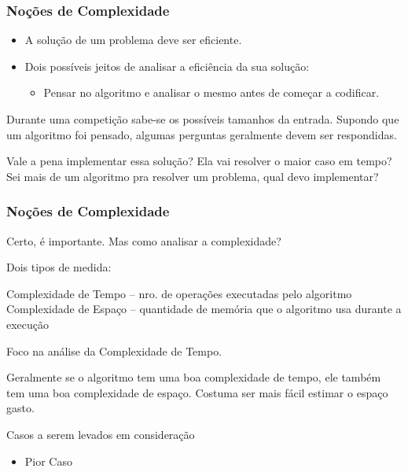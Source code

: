 \begin{frame}
\frametitle{Noções de Complexidade}

\begin{block}{}
\begin{itemize}
	\item[] A solução de um problema deve ser eficiente.
	\item[] Dois possíveis jeitos de analisar a eficiência da sua solução:
	\begin{itemize}
		\bitem Implementar e executar medindo o tempo gasto (ou submeter e torcer pra não receber TLE).
		\item[\checkmark] Pensar no algoritmo e analisar o mesmo antes de começar a codificar.
	\end{itemize}
\end{itemize}
\end{block}

\begin{block}{}
Durante uma competição sabe-se os possíveis tamanhos da entrada. Supondo que um algoritmo foi pensado, algumas perguntas geralmente devem ser respondidas.
\begin{itemize}
	\bitem Vale a pena implementar essa solução? Ela vai resolver o maior caso em tempo?
	\bitem Sei mais de um algoritmo pra resolver um problema, qual devo implementar?
\end{itemize}
\end{block}
\end{frame}

\begin{frame}
\frametitle{Noções de Complexidade}

\begin{block}{Certo, é importante. Mas como analisar a complexidade?}
\begin{itemize}
	\bitem Dois tipos de medida:
	\begin{itemize}
		\bitem Complexidade de Tempo -- nro. de operações executadas pelo algoritmo
		\bitem Complexidade de Espaço -- quantidade de memória que o algoritmo usa durante a execução 
	\end{itemize}
	\bitem Foco na análise da Complexidade de Tempo.
	\begin{itemize}
	\tiny
		\bitem Geralmente se o algoritmo tem uma boa complexidade de tempo, ele também tem uma boa complexidade de espaço.
		\bitem Costuma ser mais fácil estimar o espaço gasto.
	\end{itemize}
\end{itemize}
\end{block}

\begin{block}{Casos a serem levados em consideração}
\begin{itemize}
	\bitem Melhor caso
	\bitem Caso médio  
	\item[\checkmark]  Pior Caso
\end{itemize}
\end{block}

\end{frame}

